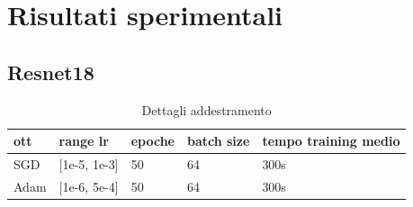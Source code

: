 \newpage
\appendix
\section{Risultati sperimentali}
\subsection{Resnet18}
\begin{table}[H]
\centering
\caption{Dettagli addestramento}
\begin{tabular}{|l|l|l|l|l|}
\hline
\textbf{ott} & \textbf{range lr} & \textbf{epoche} & \textbf{batch size} & \textbf{tempo training medio} \\ \hline
SGD          & [1e-5, 1e-3]         & 50              & 64                  & 300s                          \\ \hline
Adam         & [1e-6, 5e-4]         & 50              & 64                  & 300s                          \\ \hline
\end{tabular}
\end{table}

